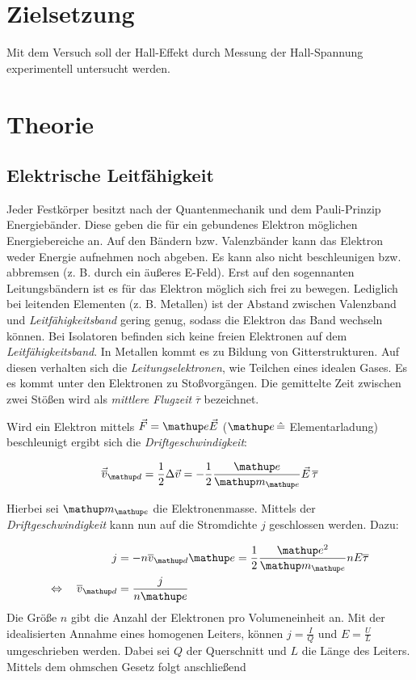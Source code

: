 \setcounter{page}{1}
\section*{Zielsetzung}
Mit dem Versuch soll der Hall-Effekt durch Messung der
Hall-Spannung experimentell untersucht werden. %

\section{Theorie}

\subsection{Elektrische Leitfähigkeit}
Jeder Festkörper besitzt nach der Quantenmechanik und dem Pauli-Prinzip
Energiebänder.
Diese geben die für ein gebundenes Elektron möglichen Energiebereiche an. Auf den Bändern bzw. Valenzbänder kann das Elektron weder
Energie aufnehmen noch abgeben.
Es kann also nicht beschleunigen bzw. abbremsen (z. B. durch ein äußeres E-Feld).
Erst auf den sogennanten Leitungsbändern ist es für das Elektron möglich
sich frei zu bewegen.
Lediglich bei leitenden Elementen (z. B. Metallen) ist der Abstand zwischen Valenzband und \emph{Leitfähigkeitsband} gering genug, sodass die Elektron das Band
wechseln können.
Bei Isolatoren befinden sich keine freien Elektronen auf dem \emph{Leitfähigkeitsband}.
In Metallen kommt es zu Bildung von Gitterstrukturen.
Auf diesen verhalten sich die \emph{Leitungselektronen}, wie Teilchen eines idealen Gases.
Es es kommt unter den Elektronen zu Stoßvorgängen.
Die gemittelte Zeit zwischen zwei Stößen wird als \emph{mittlere Flugzeit} $\overline{\tau}$ bezeichnet.

Wird ein Elektron mittels $\vec{F}=\map{e}\vec{E}$ ($\map{e}\, \hat{=}$ Elementarladung) beschleunigt %
ergibt sich die \emph{Driftgeschwindigkeit}: %

\begin{equation}
\label{eq:drift_v}
\vec{\overline{v}}\ua{d}=\frac{1}{2}\Delta\vec{v}=-\frac{1}{2}\frac{\map{e}}{\map{m}\ua{e}}\vec{E}\,\overline{\tau}
\end{equation}

Hierbei sei $\map{m}\ua{e}$ die Elektronenmasse.
Mittels der \emph{Driftgeschwindigkeit} kann nun auf die Stromdichte $j$ geschlossen werden. Dazu:

\begin{align}
j&=-n\overline{v}\ua{d}\map{e}=\frac{1}{2}\frac{\map{e^2}}{\map{m}\ua{e}}n E\overline{\tau}\notag \\
\Leftrightarrow \quad \overline{v}\ua{d}&=\frac{j}{n\map{e}}\label{eq:stromdicht}
\end{align}
Die Größe $n$ gibt die Anzahl der Elektronen pro Volumeneinheit an.
Mit der idealisierten Annahme eines homogenen Leiters, können %
$j=\frac{I}{Q}$ und $E=\frac{U}{L}$ umgeschrieben werden.
Dabei sei $Q$ der Querschnitt und $L$ die Länge des Leiters.
Mittels dem ohmschen Gesetz folgt anschließend


